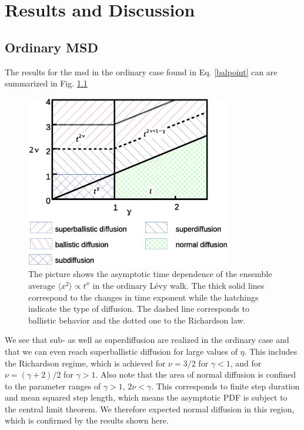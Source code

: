 \chapter{Results and Discussion}

\section{Ordinary MSD}



The results for the \gls{msd} in the ordinary case found in Eq. \ref{balpoint} can are summarized in Fig. \ref{fig:resultsMSDordinary}

\begin{figure}[h!]
\begin{center}
\includegraphics[width=90mm]{pics/resultsMSDordinary.eps}
\caption{The picture shows the asymptotic time dependence of the ensemble average $\langle x^2 \rangle \propto t^{x}$ in the ordinary L\'evy walk. The thick solid lines correspond to the changes in time exponent while the hatchings indicate the type of diffusion. The dashed line corresponds to ballistic behavior and the dotted one to the Richardson law.
\label{fig:resultsMSDordinary} }
\end{center}
\end{figure} 

We see that sub- as well as superdiffusion are realized in the ordinary case and that we can even reach superballistic diffusion for large values of $\eta$. This includes the Richardson regime, which is achieved for $\nu = 3/2$ for $\gamma <1$, and for $\nu = (\gamma + 2)/2$ for $\gamma > 1$. Also note that the area of normal diffusion is confined to the parameter ranges of $\gamma>1$, $2\nu < \gamma$. This corresponds to finite step duration and mean squared step length, which means the asymptotic \gls{PDF} is subject to the central limit theorem. We therefore expected normal diffusion in this region, which is confirmed by the results shown here.\\

